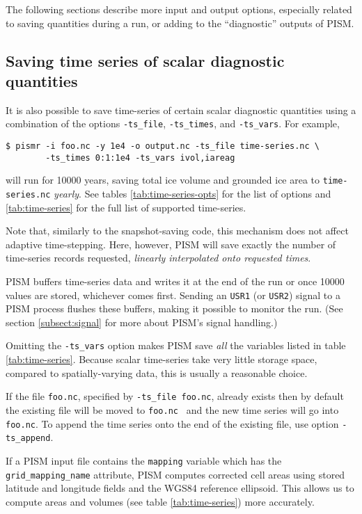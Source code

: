 The following sections describe more input and output options, especially related to saving quantities during a run, or adding to the ``diagnostic'' outputs of PISM.


\subsection{Saving time series of scalar diagnostic quantities}
\label{sec:saving-time-series}
 It is also possible to save time-series of certain scalar diagnostic quantities using a combination of the options \texttt{-ts_file}, \texttt{-ts_times}, and \texttt{-ts_vars}.  For example,
\begin{verbatim}
$ pismr -i foo.nc -y 1e4 -o output.nc -ts_file time-series.nc \
        -ts_times 0:1:1e4 -ts_vars ivol,iareag
\end{verbatim} %
will run for 10000 years, saving total ice volume and grounded ice area to \texttt{time-series.nc} \emph{yearly}. See tables \ref{tab:time-series-opts} for the list of options and \ref{tab:time-series} for the full list of supported time-series.

Note that, similarly to the snapshot-saving code, this mechanism does not affect adaptive time-stepping.  Here, however, PISM will save exactly the number of time-series records requested, \emph{linearly interpolated onto requested times}.

PISM buffers time-series data and writes it at the end of the run or once 10000
values are stored, whichever comes first. Sending an \texttt{USR1} (or
\texttt{USR2}) signal to a PISM process flushes these buffers, making it
possible to monitor the run. (See section \ref{subsect:signal} for more about
PISM's signal handling.)

Omitting the \texttt{-ts_vars} option makes PISM save \emph{all} the variables listed in table \ref{tab:time-series}.  Because scalar time-series take very little storage space, compared to spatially-varying data, this is usually a reasonable choice.

If the file \texttt{foo.nc}, specified by \texttt{-ts_file foo.nc}, already exists then by default the existing file will be moved to \texttt{foo.nc~} and the new time series will go into \texttt{foo.nc}.  To append the time series onto the end of the existing file, use option \texttt{-ts_append}.

If a PISM input file contains the \texttt{mapping} variable which has the
\texttt{grid_mapping_name} attribute, PISM computes corrected cell areas
using stored latitude and longitude fields and the WGS84 reference ellipsoid.
This allows us to compute areas and volumes (see table \ref{tab:time-series})
more accurately.

